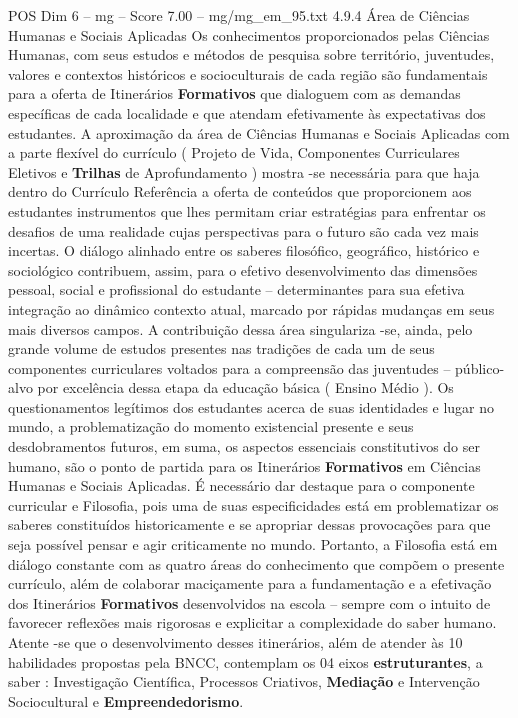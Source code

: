 \begin{textsample}{POS Dim 6 – mg – Score 7.00 – mg/mg\_em\_95.txt}  \label{ex:f6_pos_244}
4.9.4 Área de Ciências Humanas e Sociais Aplicadas Os conhecimentos proporcionados pelas Ciências Humanas, com seus estudos e métodos de pesquisa sobre território, juventudes, valores e contextos históricos e socioculturais de cada região são fundamentais para a oferta de Itinerários \textbf{Formativos} que dialoguem com as demandas específicas de cada localidade e que atendam efetivamente às expectativas dos estudantes.
A aproximação da área de Ciências Humanas e Sociais Aplicadas com a parte flexível do currículo ( Projeto de Vida, Componentes Curriculares Eletivos e \textbf{Trilhas} de Aprofundamento ) mostra -se necessária para que haja dentro do Currículo Referência a oferta de conteúdos que proporcionem aos estudantes instrumentos que lhes permitam criar estratégias para enfrentar os desafios de uma realidade cujas perspectivas para o futuro são cada vez mais incertas.
O diálogo alinhado entre os saberes filosófico, geográfico, histórico e sociológico contribuem, assim, para o efetivo desenvolvimento das dimensões pessoal, social e profissional do estudante – determinantes para sua efetiva integração ao dinâmico contexto atual, marcado por rápidas mudanças em seus mais diversos campos.
A contribuição dessa área singulariza -se, ainda, pelo grande volume de estudos presentes nas tradições de cada um de seus componentes curriculares voltados para a compreensão das juventudes – público-alvo por excelência dessa etapa da educação básica ( Ensino Médio ).
Os questionamentos legítimos dos estudantes acerca de suas identidades e lugar no mundo, a problematização do momento existencial presente e seus desdobramentos futuros, em suma, os aspectos essenciais constitutivos do ser humano, são o ponto de partida para os Itinerários \textbf{Formativos} em Ciências Humanas e Sociais Aplicadas.
É necessário dar destaque para o componente curricular e Filosofia, pois uma de suas especificidades está em problematizar os saberes constituídos historicamente e se apropriar dessas provocações para que seja possível pensar e agir criticamente no mundo.
Portanto, a Filosofia está em diálogo constante com as quatro áreas do conhecimento que compõem o presente currículo, além de colaborar maciçamente para a fundamentação e a efetivação dos Itinerários \textbf{Formativos} desenvolvidos na escola – sempre com o intuito de favorecer reflexões mais rigorosas e explicitar a complexidade do saber humano.
Atente -se que o desenvolvimento desses itinerários, além de atender às 10 habilidades propostas pela BNCC, contemplam os 04 eixos \textbf{estruturantes}, a saber : Investigação Científica, Processos Criativos, \textbf{Mediação} e Intervenção Sociocultural e \textbf{Empreendedorismo}.

\end{textsample}
